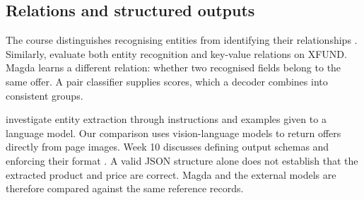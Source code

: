 \subsection{Relations and structured outputs}
The course distinguishes recognising entities from identifying their relationships \citep[Week 1, p.~12]{iecourse2026}. Similarly, \citet{xu2022xfund} evaluate both entity recognition and key-value relations on XFUND. Magda learns a different relation: whether two recognised fields belong to the same offer. A pair classifier supplies scores, which a decoder combines into consistent groups.

\citet{ashok2023} investigate entity extraction through instructions and examples given to a language model. Our comparison uses vision-language models to return offers directly from page images. Week 10 discusses defining output schemas and enforcing their format \citep[pp.~6--12]{iecourse2026}. A valid JSON structure alone does not establish that the extracted product and price are correct. Magda and the external models are therefore compared against the same reference records.

